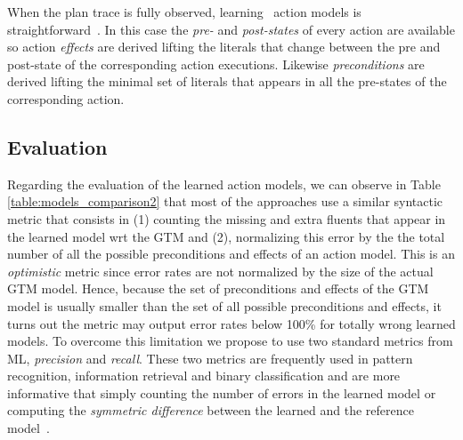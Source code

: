 When the plan trace is fully observed, learning \strips\ action models is straightforward~\cite{jimenez2012review}. In this case the {\em pre-} and {\em post-states} of every action are available so action {\em effects} are derived lifting the literals that change between the pre and post-state of the corresponding action executions. Likewise {\em preconditions} are derived lifting the minimal set of literals that appears in all the pre-states of the corresponding action.









\subsection{Evaluation}
Regarding the evaluation of the learned action models, we can observe in Table \ref{table:models_comparison2} that most of the approaches use a similar syntactic metric that consists in (1) counting the missing and extra fluents that appear in the learned model wrt the GTM and (2), normalizing this error by the the total number of all the possible preconditions and effects of an action model. This is an \emph{optimistic} metric since error rates are not normalized by the size of the actual GTM model. Hence, because the set of preconditions and effects of the GTM model is usually smaller than the set of all possible preconditions and effects, it turns out the metric may output error rates below 100\% for totally wrong learned models. To overcome this limitation we propose to use two standard metrics from ML, {\em precision} and {\em recall}. These two metrics are frequently used in pattern recognition, information retrieval and binary classification and are more informative that simply counting the number of errors in the learned model or computing the {\em symmetric difference} between the learned and the reference model~\cite{davis2006relationship}.

